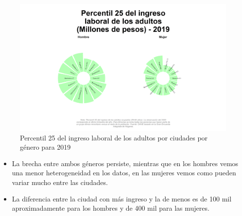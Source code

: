     \begin{figure}[H]
        \caption{Percentil 25 del ingreso laboral de los adultos por ciudades por género para 2019 \label{map_result_2} }
        \begin{center}
        \includegraphics[width=\textwidth,keepaspectratio]{img/var_6_static.png}
        \end{center}
    \end{figure}
            \begin{itemize}
                \item La brecha entre ambos géneros persiste, mientras que en los hombres vemos una menor heterogeneidad en los datos, en las mujeres vemos como pueden variar mucho entre las ciudades.
                \item La diferencia entre la ciudad con más ingreso y la de menos es de 100 mil aproximadamente para los hombres y de 400 mil para las mujeres.
                \end{itemize}

